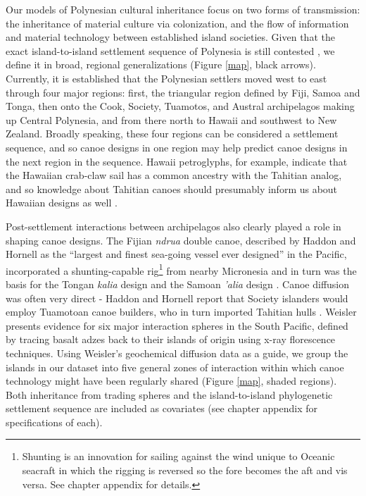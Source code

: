    Our models of Polynesian cultural inheritance focus on two forms of transmission: the inheritance of material culture via colonization, and the flow of information and material technology between established island societies.  Given that the exact island-to-island settlement sequence of Polynesia is still contested \citep{Kirch2000:Road, RogersFeldmanEhrlich2009}, we define it in broad, regional generalizations (Figure \ref{map}, black arrows).  Currently, it is established that the Polynesian settlers moved west to east through four major regions: first, the triangular region defined by Fiji, Samoa and Tonga, then onto the Cook, Society, Tuamotos, and Austral archipelagos making up Central Polynesia, and from there north to Hawaii and southwest to New Zealand.  Broadly speaking, these four regions can be considered a settlement sequence, and so canoe designs in one region may help predict canoe designs in the next region in the sequence.  Hawaii petroglyphs, for example, indicate that the Hawaiian crab-claw sail has a common ancestry with the Tahitian analog, and so knowledge about Tahitian canoes should presumably inform us about Hawaiian designs as well \citep{Lewis1978:PacificNavigators}.
   
   Post-settlement interactions between archipelagos also clearly played a role in shaping canoe designs.  The Fijian \textit{ndrua} double canoe, described by Haddon and Hornell as the ``largest and finest sea-going vessel ever designed'' in the Pacific, incorporated a shunting-capable rig\footnote{Shunting is an innovation for sailing against the wind unique to Oceanic seacraft in which the rigging is reversed so the fore becomes the aft and vis versa.  See chapter appendix for details.} from nearby Micronesia and in turn was the basis for the Tongan \textit{kalia} design and the Samoan \textit{'alia} design \citep[pg.~319]{HaddonHornell1936}.  Canoe diffusion was often very direct - Haddon and Hornell report that Society islanders would employ Tuamotoan canoe builders, who in turn imported Tahitian hulls \citep[pg.~74,79]{HaddonHornell1936}.  Weisler \citeyearpar{Weisler1998} presents evidence for six major interaction spheres in the South Pacific, defined by tracing basalt adzes back to their islands of origin using x-ray florescence techniques.  Using Weisler's geochemical diffusion data as a guide, we group the islands in our dataset into five general zones of interaction within which canoe technology might have been regularly shared (Figure \ref{map}, shaded regions).  Both inheritance from trading spheres and the island-to-island phylogenetic settlement sequence are included as covariates (see chapter appendix for specifications of each).

